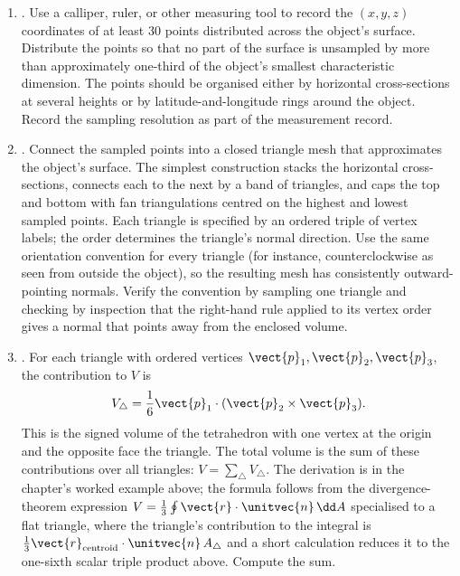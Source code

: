 \begin{project}
\begin{enumerate}[leftmargin=*]
  \item {}. Use a calliper,
    ruler, or other measuring tool to record the $(x, y, z)$
    coordinates of at least 30 points distributed across the
    object's surface. Distribute the points so that no part of the
    surface is unsampled by more than approximately one-third of the
    object's smallest characteristic dimension. The points should be
    organised either by horizontal cross-sections at several heights
    or by latitude-and-longitude rings around the object. Record the
    sampling resolution as part of the measurement record.

  \item {}. Connect the
    sampled points into a closed triangle mesh that approximates the
    object's surface. The simplest construction stacks the
    horizontal cross-sections, connects each to the next by a band
    of triangles, and caps the top and bottom with fan triangulations
    centred on the highest and lowest sampled points. Each triangle
    is specified by an ordered triple of vertex labels; the order
    determines the triangle's normal direction. Use the same
    orientation convention for every triangle (for instance,
    counterclockwise as seen from outside the object), so the
    resulting mesh has consistently outward-pointing normals.
    Verify the convention by sampling one triangle and checking by
    inspection that the right-hand rule applied to its vertex order
    gives a normal that points away from the enclosed volume.

  \item {}. For each
    triangle with ordered vertices $\vect{p}_{1}, \vect{p}_{2},
    \vect{p}_{3}$, the contribution to $V$ is
    \[
    V_{\triangle} = \frac{1}{6}
    \vect{p}_{1} \cdot (\vect{p}_{2} \times \vect{p}_{3}).
    \]
    This is the signed volume of the tetrahedron with one vertex at
    the origin and the opposite face the triangle. The total volume
    is the sum of these contributions over all triangles:
    $V = \sum_{\triangle} V_{\triangle}$. The derivation is in the
    chapter's worked example above; the formula follows from the
    divergence-theorem expression $V = \tfrac{1}{3} \oint
    \vect{r} \cdot \unitvec{n} \,\dd A$ specialised to a flat
    triangle, where the triangle's contribution to the integral is
    $\tfrac{1}{3}\vect{r}_{\text{centroid}} \cdot \unitvec{n} \,
    A_{\triangle}$ and a short calculation reduces it to the
    one-sixth scalar triple product above. Compute the sum.


\end{enumerate}
\end{project}
